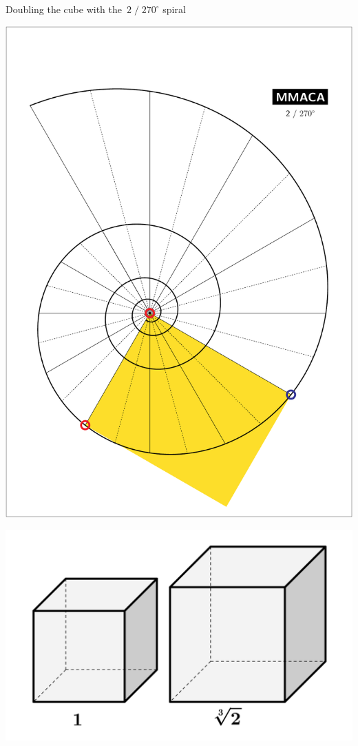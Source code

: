 \documentclass[14pt]{beamer}
\begin{document}
    \begin{frame}{Doubling the cube with the\, $2\;/\;270^\circ$ spiral}
        \begin{center}
            \begin{minipage}{25ex}
                \includegraphics[height=34ex]{pictures/Example_8.pdf}
            \end{minipage} \begin{minipage}{25ex}
                \includegraphics[height=15ex]{pictures/Doubling Cube.png}
            \end{minipage}
        \end{center}
    \end{frame}
    
\end{document}
